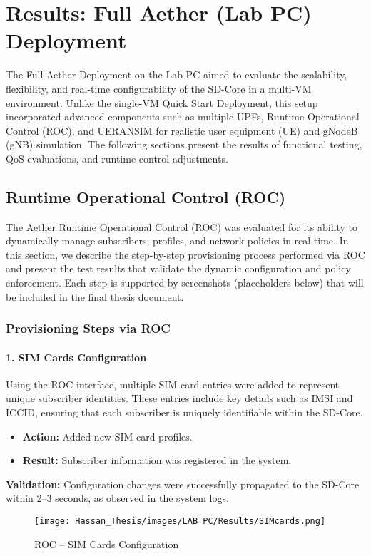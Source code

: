 \newpage
\section{Results: Full Aether (Lab PC) Deployment}
\label{sec:results-fullAether}

The Full Aether Deployment on the Lab PC aimed to evaluate the scalability, flexibility, and real-time configurability of the SD-Core in a multi-VM environment. Unlike the single-VM Quick Start Deployment, this setup incorporated advanced components such as multiple UPFs, Runtime Operational Control (ROC), and UERANSIM for realistic user equipment (UE) and gNodeB (gNB) simulation. The following sections present the results of functional testing, QoS evaluations, and runtime control adjustments.




\subsection{Runtime Operational Control (ROC)}

The Aether Runtime Operational Control (ROC) was evaluated for its ability to dynamically manage subscribers, profiles, and network policies in real time. In this section, we describe the step-by-step provisioning process performed via ROC and present the test results that validate the dynamic configuration and policy enforcement. Each step is supported by screenshots (placeholders below) that will be included in the final thesis document.

\subsubsection{Provisioning Steps via ROC}

\paragraph{1. SIM Cards Configuration}  
Using the ROC interface, multiple SIM card entries were added to represent unique subscriber identities. These entries include key details such as IMSI and ICCID, ensuring that each subscriber is uniquely identifiable within the SD-Core.
\begin{itemize}
    \item \textbf{Action:} Added new SIM card profiles.
    \item \textbf{Result:} Subscriber information was registered in the system.
\end{itemize}
\textbf{Validation:} Configuration changes were successfully propagated to the SD-Core within 2--3 seconds, as observed in the system logs.  
\begin{figure}[H]
  \centering
  \texttt{[image: Hassan\_Thesis/images/LAB PC/Results/SIMcards.png]}
  \caption{ROC – SIM Cards Configuration}
  \label{fig:SIMcards}
\end{figure}

